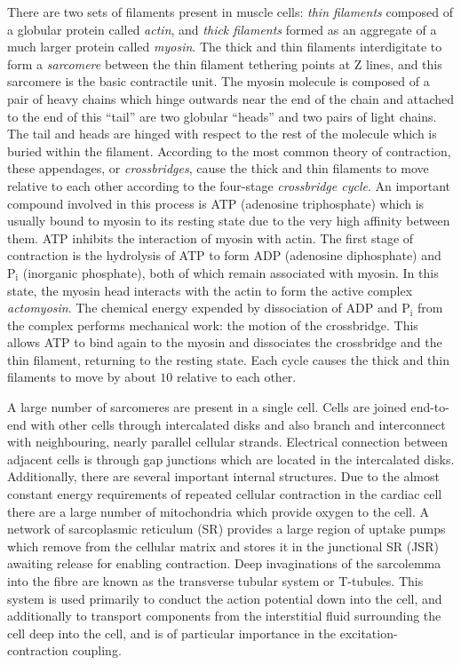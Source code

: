 There are two sets of filaments present in muscle cells: \emph{thin filaments}
composed of a globular protein called \emph{actin}, and \emph{thick filaments}
formed as an aggregate of a much larger protein called \emph{myosin}.  The
thick and thin filaments interdigitate to form a \emph{sarcomere} between the
thin filament tethering points at Z lines, and this sarcomere is the basic
contractile unit.  The myosin molecule is composed of a pair of heavy chains
which hinge outwards near the end of the chain and attached to the end of this
``tail'' are two globular ``heads'' and two pairs of light chains.  The tail
and heads are hinged with respect to the rest of the molecule which is buried
within the filament.  According to the most common theory of contraction,
these appendages, or \emph{crossbridges}, cause the thick and thin filaments
to move relative to each other according to the four-stage \emph{crossbridge
  cycle}.  An important compound involved in this process is ATP (adenosine
triphosphate) which is usually bound to myosin to its resting state due to the
very high affinity between them.  ATP inhibits the interaction of myosin with
actin.  The first stage of contraction is the hydrolysis of ATP to form ADP
(adenosine diphosphate) and $\mathrm{P_i}$ (inorganic phosphate), both of
which remain associated with myosin.  In this state, the myosin head interacts
with the actin to form the active complex \emph{actomyosin}.  The chemical
energy expended by dissociation of ADP and $\mathrm{P_i}$ from the complex
performs mechanical work: the motion of the crossbridge.  This allows ATP to
bind again to the myosin and dissociates the crossbridge and the thin
filament, returning to the resting state.  Each cycle causes the thick and
thin filaments to move by about $10$ \nm relative to each other.

A large number of sarcomeres are present in a single cell.  Cells are joined
end-to-end with other cells through intercalated disks and also branch and
interconnect with neighbouring, nearly parallel cellular strands.  Electrical
connection between adjacent cells is through gap junctions which are located
in the intercalated disks.  Additionally, there are several important internal
structures.  Due to the almost constant energy requirements of repeated
cellular contraction in the cardiac cell there are a large number of
mitochondria which provide oxygen to the cell.  A network of sarcoplasmic
reticulum (SR) provides a large region of uptake pumps which remove \ionCa
from the cellular matrix and stores it in the junctional SR (JSR) awaiting
release for enabling contraction.  Deep invaginations of the sarcolemma into
the fibre are known as the transverse tubular system or T-tubules.  This
system is used primarily to conduct the action potential down into the cell,
and additionally to transport components from the interstitial fluid
surrounding the cell deep into the cell, and is of particular importance in
the excitation-contraction coupling.

